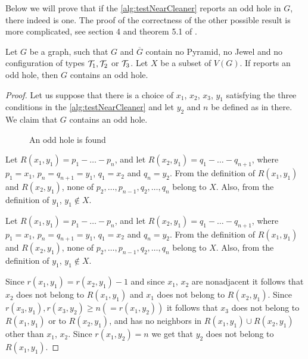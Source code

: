 Below we will prove that if the \cref{alg:testNearCleaner} reports an odd hole in $G$, there indeed is one. The proof of the correctness of the other possible result is more complicated, see section 4 and theorem 5.1 of \cite{MC05}.

\begin{theorem}
	Let $G$ be a graph, such that $G$ and $\overline{G}$ contain no Pyramid, no Jewel and no configuration of types $\mathcal{T}_1, \mathcal{T}_2$ or $\mathcal{T}_3$. Let $X$ be a subset of $V(G)$. If  reports an odd hole, then $G$ contains an odd hole.
\end{theorem}
\begin{proof}
	Let us suppose that there is a choice of $x_1$, $x_2$, $x_3$, $y_1$ satisfying the three conditions in the \cref{alg:testNearCleaner} and let $y_2$ and $n$ be defined as in there. We claim that $G$ contains an odd hole.
	
	{\makeatletter
	\let\par\@@par
	\par{}
	\everypar{}\begin{wrapfigure}{r}{0.3\textwidth}
		
		\caption{An odd hole is found}%
		\end{wrapfigure}
		Let $R(x_1, y_1) = p_1-\ldots -p_n$, and let $R(x_2, y_1) = q_1-\ldots -q_{n+1}$, where $p_1 = x_1$, $p_n = q_{n+1} = y_1$, $q_1 = x_2$ and $q_n = y_2$. From the definition of $R(x_1, y_1)$ and $R(x_2, y_1)$, none of $p_2, \ldots, p_{n-1}, q_2, \ldots, q_n$ belong to $X$. Also, from the definition of $y_1$, $y_1 \notin X$.

		Let $R(x_1, y_1) = p_1-\ldots -p_n$, and let $R(x_2, y_1) = q_1-\ldots -q_{n+1}$, where $p_1 = x_1$, $p_n = q_{n+1} = y_1$, $q_1 = x_2$ and $q_n = y_2$. From the definition of $R(x_1, y_1)$ and $R(x_2, y_1)$, none of $p_2, \ldots, p_{n-1}, q_2, \ldots, q_n$ belong to $X$. Also, from the definition of $y_1$, $y_1 \notin X$.

		Since $r(x_1, y_1) = r(x_2, y_1) - 1$ and since $x_1$, $x_2$ are nonadjacent it follows that $x_2$ does not belong to $R(x_1, y_1)$ and $x_1$ does not belong to $R(x_2, y_1)$. Since $r(x_3, y_1), r(x_3, y_2) \geq n (= r(x_1, y_2))$ it follows that $x_3$ does not belong to $R(x_1, y_1)$ or to $R(x_2, y_1)$, and has no neighbors in $R(x_1, y_1) \cup R(x_2, y_1)$ other than $x_1$, $x_2$. Since $r(x_1, y_2) = n$ we get that $y_2$ does not belong to $R(x_1, y_1)$.\par}%


\end{proof}
